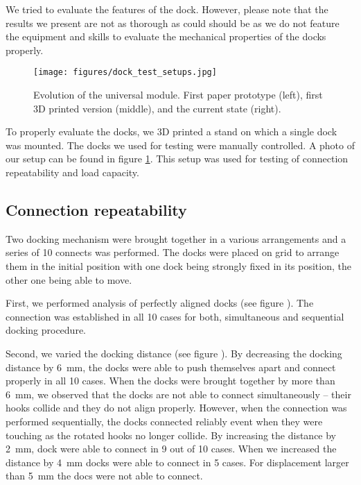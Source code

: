 We tried to evaluate the features of the dock. However, please note that the
results we present are not as thorough as could should be as we do not feature
the equipment and skills to evaluate the mechanical properties of the docks
properly.

\begin{figure}[!t]
    \centering
    \texttt{[image: figures/dock\_test\_setups.jpg]}
    \caption{Evolution of the universal module. First paper prototype (left),
    first 3D printed version (middle), and the current state (right).}
    \label{fig:dock_test_setup}
\end{figure}

To properly evaluate the docks, we 3D printed a stand on which a single dock was
mounted. The docks we used for testing were manually controlled. A photo of our
setup can be found in figure \ref{fig:dock_test_setup}. This setup was used for
testing of connection repeatability and load capacity.

\subsection{Connection repeatability}

Two docking mechanism were brought together in a various arrangements and a
series of 10 connects was performed. The docks were placed on grid to arrange
them in the initial position with one dock being strongly fixed in its position,
the other one being able to move.

First, we performed analysis of perfectly aligned docks (see figure \todo{}).
The connection was established in all 10 cases for both, simultaneous and
sequential docking procedure.

Second, we varied the docking distance (see figure \todo{}). By decreasing the
docking distance by 6~mm, the docks were able to push themselves apart and
connect properly in all 10 cases. When the docks were brought together by more
than 6~mm, we observed that the docks are not able to connect simultaneously --
their hooks collide and they do not align properly. However, when the connection
was performed sequentially, the docks connected reliably event when they were
touching as the rotated hooks no longer collide. By increasing the distance by
2~mm, dock were able to connect in 9 out of 10 cases. When we increased the
distance by 4~mm docks were able to connect in 5 cases. For displacement larger
than 5~mm the docs were not able to connect.

